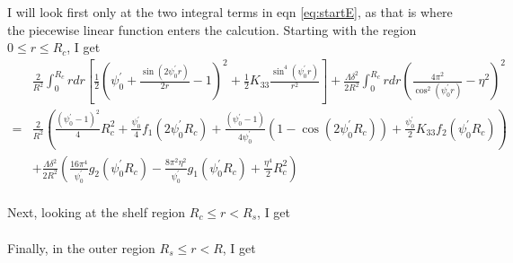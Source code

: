 \documentclass[12pt]{article}
\begin{document}
I will look first only at the two integral terms in eqn \ref{eq:startE}, as that is where the piecewise linear function enters the calcution. Starting with the region $0\leq r \leq R_c$, I get
\begin{align}
\phantom{=}&\frac{2}{R^2}\int_0^{R_c}rdr\left[\frac{1}{2}\left(\psi_0^{\prime}+\frac{\sin(2\psi_0^{\prime}r)}{2r}-1\right)^2+\frac{1}{2}K_{33}\frac{\sin^4(\psi_0^{\prime}r)}{r^2}\right]+\frac{\Lambda\delta^2}{2R^2}\int_0^{R_c}rdr\left(\frac{4\pi^2}{\cos^2(\psi_0^{\prime}r)}-\eta^2\right)^2\nonumber\\
=&\frac{2}{R^2}\left(\frac{(\psi_0^{\prime}-1)^2}{4}R_c^2+\frac{\psi_0^{\prime}}{4}f_1(2\psi_0^{\prime}R_c)+\frac{(\psi_0^{\prime}-1)}{4\psi_0^{\prime}}(1-\cos(2\psi_0^{\prime}R_c))+\frac{\psi_0^{\prime}}{2}K_{33}f_2(\psi_0^{\prime}R_c)\right)\nonumber\\
\phantom{=}&+\frac{\Lambda\delta^2}{2R^2}\left(\frac{16\pi^4}{\psi_0^{\prime}}g_2(\psi_0^{\prime}R_c)-\frac{8\pi^2\eta^2}{\psi_0^{\prime}}g_1(\psi_0^{\prime}R_c)+\frac{\eta^4}{2}R_c^2\right)\nonumber\\
\end{align}

Next, looking at the shelf region $R_c\leq r < R_s$, I get
\begin{align}
\end{align}


Finally, in the outer region $R_s\leq r < R$, I get
\begin{align}
\end{align}
\end{document}
